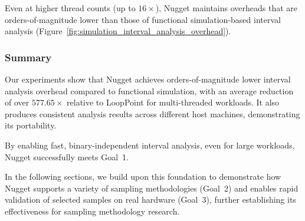 Even at higher thread counts (up to $16\times$), Nugget maintains overheads that are orders-of-magnitude lower than those of functional simulation-based interval analysis (Figure~\ref{fig:simulation_interval_analysis_overhead}).

\subsubsection{Summary}\label{sec:interval_analysis_overhead_summary}

Our experiments show that Nugget achieves orders-of-magnitude lower interval analysis overhead compared to functional simulation, with an average reduction of over $577.65\times$ relative to LoopPoint for multi-threaded workloads.
It also produces consistent analysis results across different host machines, demonstrating its portability.

By enabling fast, binary-independent interval analysis, even for large workloads, Nugget successfully meets Goal~1.

In the following sections, we build upon this foundation to demonstrate how Nugget supports a variety of sampling methodologies (Goal~2) and enables rapid validation of selected samples on real hardware (Goal~3), further establishing its effectiveness for sampling methodology research.
